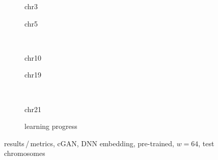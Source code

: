 \begin{figure}[p] %
    \begin{subfigure}{0.45\textwidth}
        \scriptsize
        \caption{chr3}
    \end{subfigure} \hfill
    \begin{subfigure}{0.45\textwidth}
        \scriptsize
        \caption{chr5}
    \end{subfigure}\\[5mm]
    \begin{subfigure}{0.45\textwidth}
        \scriptsize
        \caption{chr10}
    \end{subfigure}\hfill
    \begin{subfigure}{0.45\textwidth}
        \scriptsize
        \caption{chr19}
    \end{subfigure}\\[3mm]
    \begin{subfigure}{0.45\textwidth}
        \scriptsize
        \caption{chr21}
    \end{subfigure} \hfill
    \begin{subfigure}{0.45\textwidth}
        \scriptsize
        \caption{learning progress} \label{fig:results:GAN64__pretrain-dnn_lossEpochs}
    \end{subfigure}
    \caption{results\,/\,metrics, cGAN, DNN embedding, pre-trained, $w=64$, test chromosomes}   \label{fig:results:GAN64_pretrain-dnn_pearson}
\end{figure}
